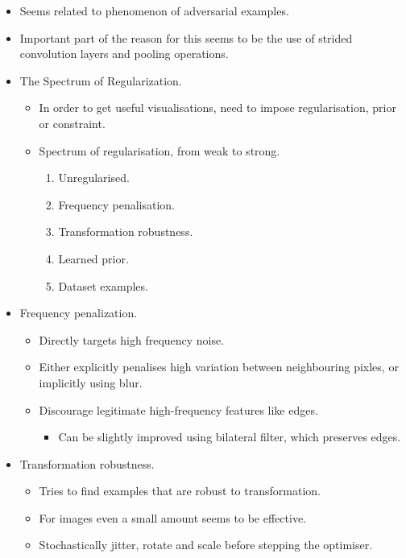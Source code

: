 \begin{itemize}
\begin{itemize}
        \item Seems related to phenomenon of adversarial examples.
        \item Important part of the reason for this seems to be the use of strided convolution layers and pooling operations.
        \item The Spectrum of Regularization.
        \begin{itemize}
            \item In order to get useful visualisations, need to impose regularisation, prior or constraint.
            \item Spectrum of regularisation, from weak to strong.
            \begin{enumerate}[label=(\roman*)]
                \item Unregularised.
                \item Frequency penalisation.
                \item Transformation robustness.
                \item Learned prior.
                \item Dataset examples.
            \end{enumerate}
        \end{itemize}
        \item Frequency penalization.
        \begin{itemize}
            \item Directly targets high frequency noise.
            \item Either explicitly penalises high variation between neighbouring pixles, or implicitly using blur.
            \item Discourage legitimate high-frequency features like edges.
            \begin{itemize}
                \item Can be slightly improved using bilateral filter, which preserves edges.
            \end{itemize}
        \end{itemize}
        \item Transformation robustness.
        \begin{itemize}
            \item Tries to find examples that are robust to transformation.
            \item For images even a small amount seems to be effective.
            \item Stochastically jitter, rotate and scale before stepping the optimiser.

\end{itemize}
\end{itemize}
\end{itemize}
